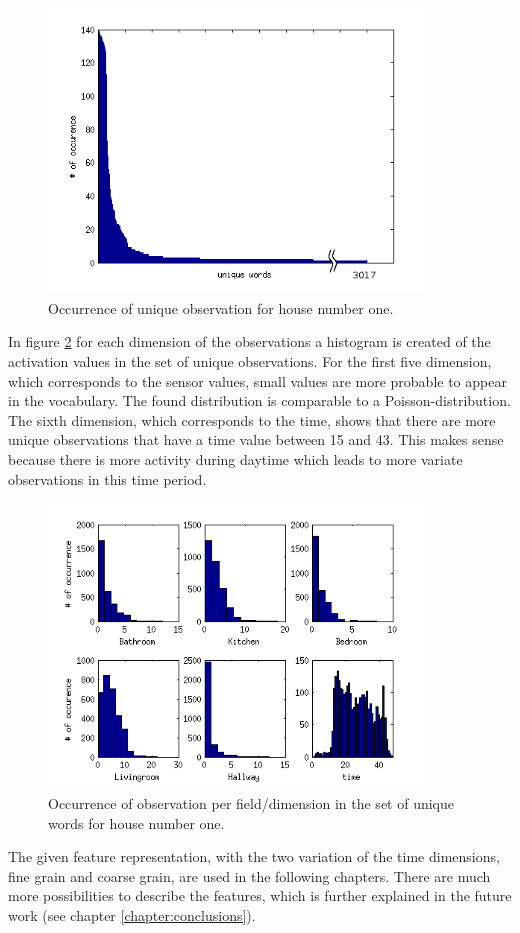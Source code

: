\begin{figure}[h]
 \centering
 \includegraphics[width=0.9\textwidth]{Pictures/Occ.png}
 \caption{Occurrence of unique observation for house number one.}
 \label{fig:occurence}
\end{figure}


In figure \ref{fig:FieldDistr} for each dimension of the observations a histogram is created of the activation values in the set of unique observations. For the first five dimension, which corresponds to the sensor values, small values are more probable to appear in the vocabulary. The found distribution is comparable to a Poisson-distribution. The sixth dimension, which corresponds to the time, shows that there are more unique observations that have a time value between 15 and 43. This makes sense because there is more activity during daytime which leads to more variate observations in this time period.\\


\begin{figure}[h]
 \centering
 \includegraphics[width=0.9\textwidth]{Pictures/OccField2.png}
 \caption{Occurrence of observation per field/dimension in the set of unique words for house number one.}
 \label{fig:FieldDistr}
\end{figure}

The given feature representation, with the two variation of the time dimensions, fine grain and coarse grain, are used in the following chapters. There are much more possibilities to describe the features, which is further explained in the future work (see chapter \ref{chapter:conclusions}).
